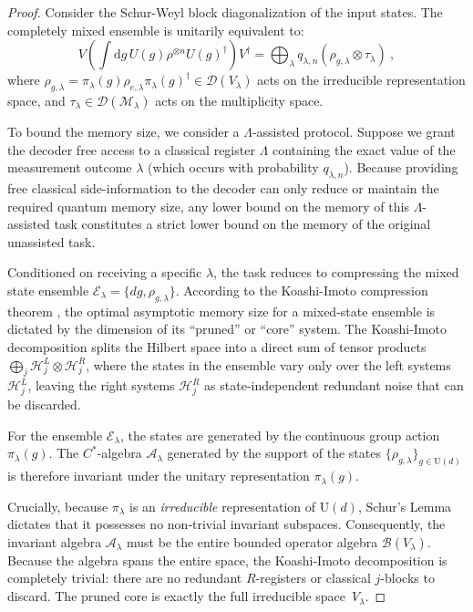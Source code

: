 \documentclass[11pt,letterpaper]{article}
\begin{document}
\begin{proof}
Consider the Schur-Weyl block diagonalization of the input states. The completely mixed ensemble is unitarily equivalent to:
\begin{equation}
    V \left( \int \mathrm{d}g \, U(g)\rho^{\otimes n} U(g)^\dagger \right) V^\dagger = \bigoplus_{\lambda} q_{\lambda,n} \left( \rho_{g,\lambda} \otimes \tau_\lambda \right) \ ,
\end{equation}
where $\rho_{g,\lambda} = \pi_\lambda(g) \rho_{e,\lambda} \pi_\lambda(g)^\dagger \in \mathcal{D}(V_\lambda)$ acts on the irreducible representation space, and $\tau_\lambda \in \mathcal{D}(\mathcal{M}_\lambda)$ acts on the multiplicity space.

To bound the memory size, we consider a $\Lambda$-assisted protocol. Suppose we grant the decoder free access to a classical register $\Lambda$ containing the exact value of the measurement outcome $\lambda$ (which occurs with probability $q_{\lambda,n}$). Because providing free classical side-information to the decoder can only reduce or maintain the required quantum memory size, any lower bound on the memory of this $\Lambda$-assisted task constitutes a strict lower bound on the memory of the original unassisted task.

Conditioned on receiving a specific $\lambda$, the task reduces to compressing the mixed state ensemble $\mathcal{E}_\lambda = \{dg, \rho_{g,\lambda}\}$. According to the Koashi-Imoto compression theorem \cite{koashi2001compressibility,koashi2001possible}, the optimal asymptotic memory size for a mixed-state ensemble is dictated by the dimension of its ``pruned'' or ``core'' system. The Koashi-Imoto decomposition splits the Hilbert space into a direct sum of tensor products $\bigoplus_j \mathcal{H}_j^L \otimes \mathcal{H}_j^R$, where the states in the ensemble vary only over the left systems $\mathcal{H}_j^L$, leaving the right systems $\mathcal{H}_j^R$ as state-independent redundant noise that can be discarded.

For the ensemble $\mathcal{E}_\lambda$, the states are generated by the continuous group action $\pi_\lambda(g)$. The $C^*$-algebra $\mathcal{A}_\lambda$ generated by the support of the states $\{\rho_{g,\lambda}\}_{g \in \mathrm{U}(d)}$ is therefore invariant under the unitary representation $\pi_\lambda(g)$. 

Crucially, because $\pi_\lambda$ is an \emph{irreducible} representation of $\mathrm{U}(d)$, Schur's Lemma dictates that it possesses no non-trivial invariant subspaces. Consequently, the invariant algebra $\mathcal{A}_\lambda$ must be the entire bounded operator algebra $\mathcal{B}(V_\lambda)$. Because the algebra spans the entire space, the Koashi-Imoto decomposition is completely trivial: there are no redundant $R$-registers or classical $j$-blocks to discard. The pruned core is exactly the full irreducible space~$V_\lambda$.


\end{proof}
\end{document}
